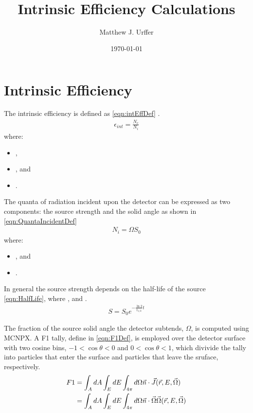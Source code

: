 \documentclass[draftcls,onecolumn]{IEEEtran}
\begin{document}
\title{Intrinsic Efficiency Calculations}
\author{Matthew J. Urffer}
\date{\today}
\maketitle

\printnomenclature
\printindex

\listoftodos
\tableofcontents
\listoffigures
\listoftables
\lstlistoflistings
\section{Intrinsic Efficiency}
The intrinsic efficiency is defined as \eqref{eqn:intEffDef} \cite{knoll_radiation_2009}.
\begin{align}
  \label{eqn:intEffDef}
  \epsilon_{int} = \frac{N_c}{N_i}
\end{align}
where:
\begin{itemize}
  \item[] ,
  \item[] , and
  \item[] .
\end{itemize}
The quanta of radiation incident upon the detector can be expressed as two components: the source strength and the solid angle as shown in \eqref{eqn:QuantaIncidentDef}
\begin{align}
  \label{eqn:QuantaIncidentDef}
  N_i = \Omega S_0
\end{align}
where:
\begin{itemize}
  \item[] , and 
  \item[] .
\end{itemize}
In general the source strength depends on the half-life of the source \eqref{eqn:HalfLife}, where ,  and .
\begin{align}
  \label{eqn:HalfLife}
  S = S_0 e^{-\frac{\ln{2}}{t_{1/2}} t}
\end{align}

The fraction of the source solid angle the detector subtends, $\Omega$, is computed using MCNPX. 
A F1 tally, define in \eqref{eqn:F1Def}, is employed over the detector surface with two cosine bins, $-1<\cos\theta<0$ and $0<\cos\theta<1$, which divivide the tally into particles that enter the surface and particles that leave the sruface, respectively.
\begin{align}
  \label{eqn:F4Def}
  F1 &= \int_A dA \int_E dE \int_{4\pi} d\Omega \vec{n}\cdot\vec{J}(\vec{r},E,\vec{\Omega}) \\
   &= \int_A dA \int_E dE \int_{4\pi} d\Omega \vec{n}\cdot\vec{\Omega}\vec{\Omega}(\vec{r},E,\vec{\Omega}) \notag
\end{align}
\end{document}

